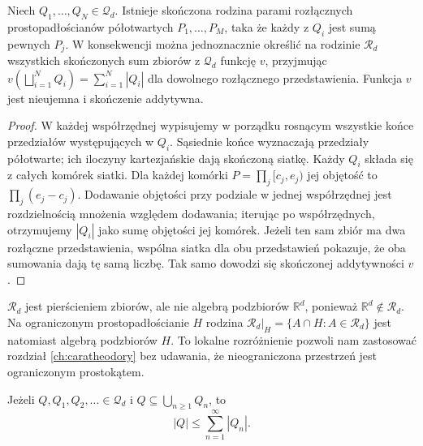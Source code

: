 \begin{lemat}
\label{lem:rect-grid}
Niech $Q_1,\ldots,Q_N\in\mathcal Q_d$.
Istnieje skończona rodzina parami rozłącznych
prostopadłościanów półotwartych $P_1,\ldots,P_M$, taka że
każdy z $Q_i$ jest sumą pewnych $P_j$. W konsekwencji
można jednoznacznie określić na rodzinie $\mathcal R_d$
wszystkich skończonych sum zbiorów z $\mathcal Q_d$
funkcję $v$, przyjmując
$v(\bigsqcup_{i=1}^NQ_i)=\sum_{i=1}^N|Q_i|$
dla dowolnego rozłącznego przedstawienia.
Funkcja $v$ jest nieujemna i skończenie addytywna.
\end{lemat}

\begin{proof}
W każdej współrzędnej wypisujemy w porządku rosnącym
wszystkie końce przedziałów występujących w $Q_i$.
Sąsiednie końce wyznaczają przedziały półotwarte;
ich iloczyny kartezjańskie dają skończoną siatkę.
Każdy $Q_i$ składa się z całych komórek siatki.
Dla każdej komórki $P=\prod_j[c_j,e_j)$ jej objętość
to $\prod_j(e_j-c_j)$. Dodawanie objętości przy
podziale w jednej współrzędnej jest rozdzielnością
mnożenia względem dodawania; iterując po współrzędnych,
otrzymujemy $|Q_i|$ jako sumę objętości jej komórek.
Jeżeli ten sam zbiór ma dwa rozłączne przedstawienia,
wspólna siatka dla obu przedstawień pokazuje, że oba
sumowania dają tę samą liczbę. Tak samo dowodzi się
skończonej addytywności $v$.
\end{proof}

\begin{uwaga}
$\mathcal R_d$ jest pierścieniem zbiorów, ale nie
algebrą podzbiorów $\mathbb R^d$, ponieważ
$\mathbb R^d\notin\mathcal R_d$. Na ograniczonym
prostopadłościanie $H$ rodzina
$\mathcal R_d|_H=\{A\cap H:A\in\mathcal R_d\}$
jest natomiast algebrą podzbiorów $H$.
To lokalne rozróżnienie pozwoli nam zastosować
rozdział \ref{ch:caratheodory} bez udawania, że
nieograniczona przestrzeń jest ograniczonym prostokątem.
\end{uwaga}

\begin{lemat}
\label{lem:rect-cover-ineq}
Jeżeli $Q,Q_1,Q_2,\ldots\in\mathcal Q_d$ i
$Q\subseteq\bigcup_{n\ge1}Q_n$, to
\begin{equation}\label{eq:rect-cover-volume}
|Q|\le\sum_{n=1}^\infty|Q_n|.
\end{equation}
\end{lemat}

